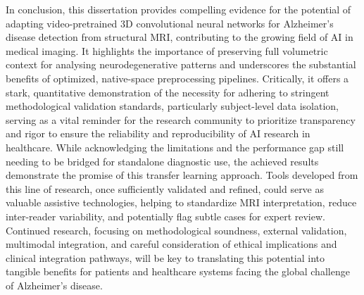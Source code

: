 \documentclass[11pt, a4paper]{article}
\begin{document}
In conclusion, this dissertation provides compelling evidence for the potential of adapting video-pretrained 3D convolutional neural networks for Alzheimer's disease detection from structural MRI, contributing to the growing field of AI in medical imaging. It highlights the importance of preserving full volumetric context for analysing neurodegenerative patterns and underscores the substantial benefits of optimized, native-space preprocessing pipelines. Critically, it offers a stark, quantitative demonstration of the necessity for adhering to stringent methodological validation standards, particularly subject-level data isolation, serving as a vital reminder for the research community to prioritize transparency and rigor to ensure the reliability and reproducibility of AI research in healthcare. While acknowledging the limitations and the performance gap still needing to be bridged for standalone diagnostic use, the achieved results demonstrate the promise of this transfer learning approach. Tools developed from this line of research, once sufficiently validated and refined, could serve as valuable assistive technologies, helping to standardize MRI interpretation, reduce inter-reader variability, and potentially flag subtle cases for expert review. Continued research, focusing on methodological soundness, external validation, multimodal integration, and careful consideration of ethical implications and clinical integration pathways, will be key to translating this potential into tangible benefits for patients and healthcare systems facing the global challenge of Alzheimer's disease.


 

\appendix





\end{document}
